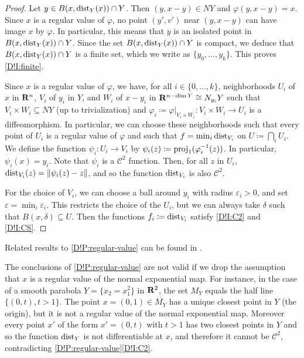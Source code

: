 \begin{proof}
  Let $y \in B(x, \operatorname{dist}_Y(x)) \cap Y$. Then $(y, x - y) \in N Y$ and $\varphi(y, x - y) = x$. Since $x$ is a regular value of $\varphi$, no point $(y', v')$ near $(y, x - y)$ can have image $x$ by $\varphi$. In particular, this means that $y$ is an isolated point in $B(x, \operatorname{dist}_Y(x)) \cap Y$. Since the set $B(x, \operatorname{dist}_Y(x)) \cap Y$ is compact, we deduce that $B(x, \operatorname{dist}_Y(x)) \cap Y$ is a finite set, which we write as $\{y_0, \ldots, y_k\}$. This proves \eqref{D!I:finite}.

  Since $x$ is a regular value of $\varphi$, we have, for all $i \in \{0, \ldots, k\}$, neighborhoods $U_i$ of $x$ in $\mathbf{R}^n$, $V_i$ of $y_i$ in $Y$, and $W_i$ of $x - y_i$ in $\mathbf{R}^{n - \dim Y} \cong N_{y_i} Y$ such that $V_i \times W_i \subseteq N Y$ (up to trivialization) and $\varphi_i \coloneq \varphi|_{V_i \times W_i} \colon V_i \times W_i \to U_i$ is a diffeomorphism. In particular, we can choose these neighborhoods such that every point of $U_i$ is a regular value of $\varphi$ and such that $f = \min_i \operatorname{dist}_{V_i}$ on $U \coloneq \bigcap_i U_i$. We define the function $\psi_i \colon U_i \to V_i$ by $\psi_i(z) \coloneq \textnormal{proj}_1 (\varphi_i^{-1}(z))$. In particular, $\psi_i(x) = y_i$. Note that $\psi_i$ is a $\mathcal{C}^2$ function. Then, for all $z$ in $U_i$, $\operatorname{dist}_{V_i}(z) = \|\psi_i(z) - z\|$, and so the function $\operatorname{dist}_{V_i}$ is also $\mathcal{C}^2$.

  For the choice of $V_i$, we can choose a ball around $y_i$ with radius $\varepsilon_i > 0$, and set $\varepsilon = \min_i \varepsilon_i$. This restricts the choice of the $U_i$, but we can always take $\delta$ such that $B(x, \delta) \subseteq U$. Then the functions $f_i \coloneq \operatorname{dist}_{V_i}$ satisfy \eqref{D!I:C2} and \eqref{D!I:CS}.
\end{proof}

Related results to \cref{D!P:regular-value} can be found in \cite[Sect.~3]{SYM2025}.

\begin{example}
\label{D!example:nonCS}
  The conclusions of \cref{D!P:regular-value} are not valid if we drop the assumption that $x$ is a regular value of the normal exponential map. For instance, in the case of a smooth parabola $Y=\{x_2=x_1^2\}$ in $\mathbf{R}^2$, the set $M_Y$ equals the half line $\{(0, t), t > 1\}$. The point $x=(0,1) \in \overline{M_Y}$ has a unique closest point in $Y$ (the origin), but it is not a regular value of the normal exponential map. Moreover every point $x'$ of the form $x'=(0, t)$ with $t>1$ has two closest points in $Y$ and so the function $\operatorname{dist}_Y$ is not differentiable at $x$, and therefore it cannot be $\mathcal{C}^2$, contradicting \cref{D!P:regular-value}\eqref{D!I:C2}.
\end{example}

